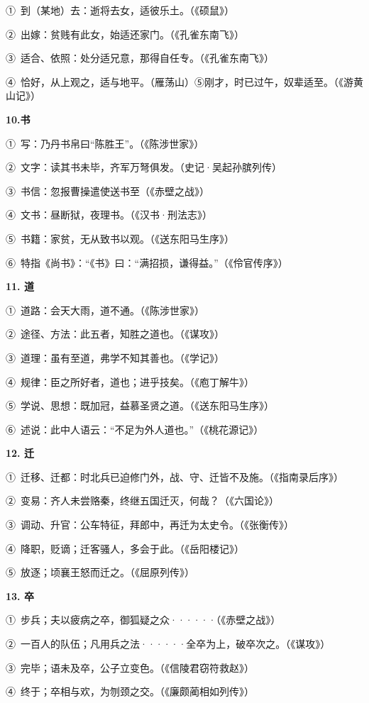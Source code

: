 ①\ 到（某地）去：逝将去女，适彼乐土。（《硕鼠》）

②\ 出嫁：贫贱有此女，始适还家门。（《孔雀东南飞》）

③\ 适合、依照：处分适兄意，那得自任专。（《孔雀东南飞》）

④\ 恰好，从上观之，适与地平。（雁荡山）⑤刚才，时已过午，奴辈适至。（《游黄山记》）

\textbf{10.书}

①\ 写：乃丹书帛曰“陈胜王”。（《陈涉世家》）

②\ 文字：读其书未毕，齐军万弩俱发。（史记·吴起孙膑列传）

③\ 书信：忽报曹操遣使送书至（《赤壁之战》）

④\ 文书：昼断狱，夜理书。（《汉书·刑法志》）

⑤\ 书籍：家贫，无从致书以观。（《送东阳马生序》）

⑥\ 特指《尚书》：“《书》曰：“满招损，谦得益。”（《伶官传序》）

\textbf{11. 道}

①\ 道路：会天大雨，道不通。（《陈涉世家》）

②\ 途径、方法：此五者，知胜之道也。（《谋攻》）

③\ 道理：虽有至道，弗学不知其善也。（《学记》）

④\ 规律：臣之所好者，道也；进乎技矣。（《庖丁解牛》）

⑤\ 学说、思想：既加冠，益慕圣贤之道。（《送东阳马生序》）

⑥\ 述说：此中人语云：“不足为外人道也。”（《桃花源记》）

\textbf{12. 迁}

①\ 迁移、迁都：时北兵已迫修门外，战、守、迁皆不及施。（《指南录后序》）

②\ 变易：齐人未尝赂秦，终继五国迁灭，何哉？（《六国论》）

③\ 调动、升官：公车特征，拜郎中，再迁为太史令。（《张衡传》）

④\ 降职，贬谪；迁客骚人，多会于此。（《岳阳楼记》）

⑤\ 放逐；顷襄王怒而迁之。（《屈原列传》）

\textbf{13. 卒}

①\ 步兵；夫以疲病之卒，御狐疑之众······（《赤壁之战》）

②\ 一百人的队伍；凡用兵之法······全卒为上，破卒次之。（《谋攻》）

③\ 完毕；语未及卒，公子立变色。（《信陵君窃符救赵》）

④\ 终于；卒相与欢，为刎颈之交。（《廉颇蔺相如列传》）

